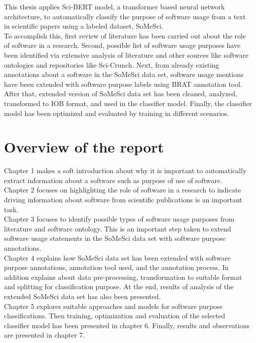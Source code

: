 This thesis applies \ac{Sci-BERT} model, a  transformer based neural network architecture, to automatically classify the purpose of software usage from a text in scientific papers using a labeled dataset, \ac{SoMeSci}. \\

To accomplish this, first review of literature has been carried out about the role of software in a research. Second, possible list of software usage purposes have been identified via extensive analysis of literature and other sources like software ontologies and repositories like Sci-Crunch. Next, from already existing annotations about a software in the \ac{SoMeSci} data set, software usage mentions have been extended with software purpose labels using  BRAT annotation tool. After that, extended version of \ac{SoMeSci} data set has been cleaned, analyzed, transformed to \ac{IOB} format, and used in the classifier model. Finally, the classifier model has been optimized and evaluated by training in different scenarios. 


%
%
\section{ Overview of the report }
\label{sec:intro:Overview}
\noindent Chapter 1 makes a soft introduction about why it is important to automatically extract information about a software such as purpose of use of software.  \\

\noindent Chapter 2 focuses on highlighting the role of software in a research to indicate driving information about software from scientific publications is an important task.  \\

\noindent Chapter 3 focuses to identify possible types of software usage purposes from literature and software ontology. This is an important step taken to extend software usage statements in the \ac{SoMeSci} data set with software purpose annotations.  \\

\noindent Chapter 4  explains how \ac{SoMeSci} data set has been extended with software purpose annotations, annotation tool used, and the annotation process. In addition explains about data pre-processing, transformation to suitable format and splitting for classification purpose. At the end, results of analysis of the extended SoMeSci data set has also been presented.  \\


\noindent Chapter 5 explores suitable approaches and models for software purpose classifications.  Then training, optimization and evaluation of the selected classifier model has been presented in chapter 6. Finally, results and observations are presented in chapter 7.  \\



